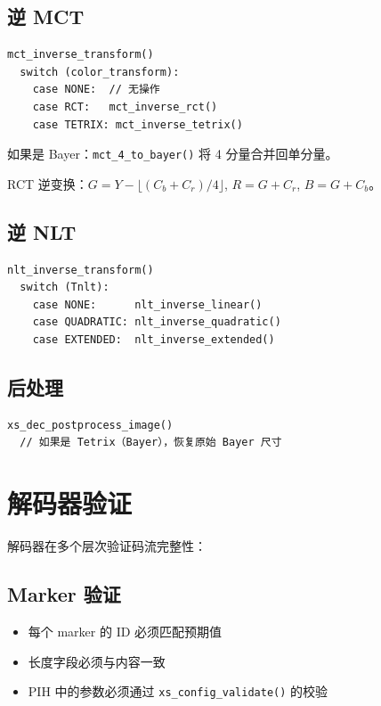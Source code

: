 \subsection{逆 MCT}

\begin{lstlisting}[numbers=none]
mct_inverse_transform()
  switch (color_transform):
    case NONE:  // 无操作
    case RCT:   mct_inverse_rct()
    case TETRIX: mct_inverse_tetrix()
\end{lstlisting}

如果是 Bayer：\texttt{mct\_4\_to\_bayer()} 将 4 分量合并回单分量。

RCT 逆变换：$G = Y - \lfloor(C_b + C_r)/4\rfloor$, $R = G + C_r$, $B = G + C_b$。

\subsection{逆 NLT}

\begin{lstlisting}[numbers=none]
nlt_inverse_transform()
  switch (Tnlt):
    case NONE:      nlt_inverse_linear()
    case QUADRATIC: nlt_inverse_quadratic()
    case EXTENDED:  nlt_inverse_extended()
\end{lstlisting}

\subsection{后处理}

\begin{lstlisting}[numbers=none]
xs_dec_postprocess_image()
  // 如果是 Tetrix（Bayer），恢复原始 Bayer 尺寸
\end{lstlisting}

\section{解码器验证}

解码器在多个层次验证码流完整性：

\subsection{Marker 验证}

\begin{itemize}
  \item 每个 marker 的 ID 必须匹配预期值
  \item 长度字段必须与内容一致
  \item PIH 中的参数必须通过 \texttt{xs\_config\_validate()} 的校验
\end{itemize}

